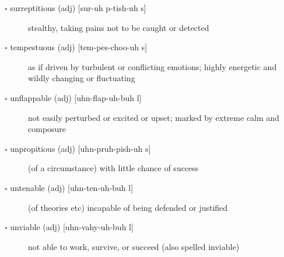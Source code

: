 \documentclass[11pt]{article}
\begin{document}
\begin{description}
\item[{$\square$ surreptitious (adj) [sur-uh p-tish-uh s]}] stealthy, taking pains not to be caught or detected
\item[{$\square$ tempestuous (adj) [tem-pes-choo-uh s]}] as if driven by turbulent or conflicting emotions; highly energetic and wildly changing or fluctuating
\item[{$\square$ unflappable (adj) [uhn-flap-uh-buh l]}] not easily perturbed or excited or upset; marked by extreme calm and composure
\item[{$\square$ unpropitious (adj) [uhn-pruh-pish-uh s]}] (of a circumstance) with little chance of success
\item[{$\square$ untenable (adj) [uhn-ten-uh-buh l]}] (of theories etc) incapable of being defended or justified
\item[{$\square$ unviable (adj) [uhn-vahy-uh-buh l]}] not able to work, survive, or succeed (also spelled inviable)
\end{description}
\end{document}
